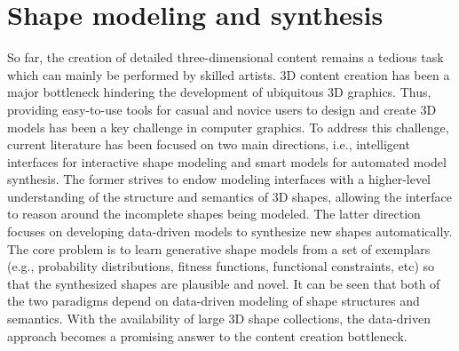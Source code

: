 
\section{Shape modeling and synthesis}
\label{sec:modeling}

So far, the creation of detailed three-dimensional content remains a tedious task which can mainly be performed by skilled artists.
3D content creation has been a major bottleneck hindering the development of ubiquitous 3D graphics.
Thus, providing easy-to-use tools for casual and novice users to design and create 3D models has been a key
challenge in computer graphics. To address this challenge, current literature has been focused on two main directions, i.e.,
intelligent interfaces for interactive shape modeling and smart models for automated model synthesis.
%
The former strives to endow modeling interfaces with a higher-level understanding of the structure and semantics
of 3D shapes, allowing the interface to reason around the incomplete shapes being modeled. The latter direction focuses on developing data-driven models to synthesize new shapes automatically.
The core problem is to learn generative shape models from a set of exemplars (e.g., probability distributions, fitness functions, functional constraints, etc) so that the synthesized shapes are plausible and novel.
It can be seen that both of the two paradigms depend on data-driven modeling of shape structures and semantics.
With the availability of large 3D shape collections, the data-driven approach becomes a promising answer to the content creation bottleneck.

